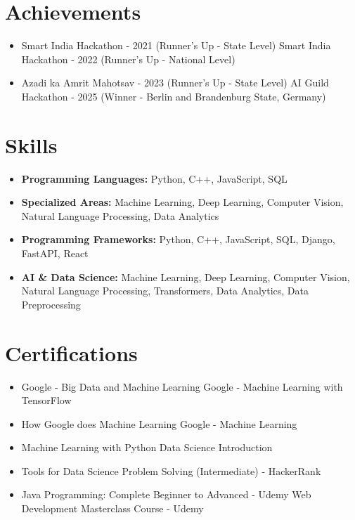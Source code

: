\documentclass[a4paper,10pt]{article}
\begin{document}
\section*{Achievements}
\begin{itemize}
\item Smart India Hackathon - 2021 (Runner's Up - State Level) \hfill Smart India Hackathon - 2022 (Runner's Up - National Level)
\item Azadi ka Amrit Mahotsav - 2023 (Runner's Up - State Level) \hfill AI Guild Hackathon - 2025 (Winner - Berlin and Brandenburg State, Germany)
\end{itemize}

\section*{Skills}
\begin{itemize}
  \item \textbf{Programming Languages:} Python, C++, JavaScript, SQL
  \item \textbf{Specialized Areas:} Machine Learning, Deep Learning, Computer Vision, Natural Language Processing, Data Analytics
  \item \textbf{Programming Frameworks:} Python, C++, JavaScript, SQL, Django, FastAPI, React
  \item \textbf{AI \& Data Science:} Machine Learning, Deep Learning, Computer Vision, Natural Language Processing, Transformers, Data Analytics, Data Preprocessing
\end{itemize}

\section*{Certifications}
\begin{itemize}
\item Google - Big Data and Machine Learning \hfill Google - Machine Learning with TensorFlow
\item How Google does Machine Learning \hfill Google - Machine Learning
\item Machine Learning with Python \hfill Data Science Introduction
\item Tools for Data Science \hfill Problem Solving (Intermediate) - HackerRank
\item Java Programming: Complete Beginner to Advanced - Udemy \hfill Web Development Masterclass Course - Udemy
\end{itemize}
\end{document}
